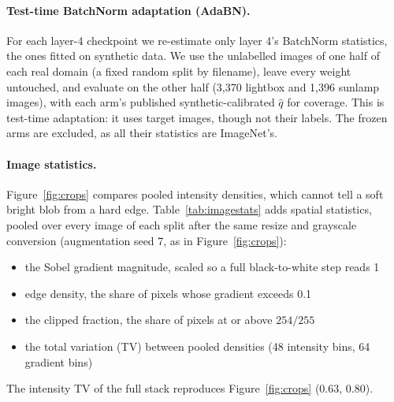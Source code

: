 \paragraph{Test-time BatchNorm adaptation (AdaBN).} For each layer-4 checkpoint we
re-estimate only layer 4's BatchNorm statistics, the ones fitted on synthetic data. We use
the unlabelled images of one half of each real domain (a fixed random split by filename),
leave every weight untouched, and evaluate on the other half (3{,}370 lightbox and 1{,}396
sunlamp images), with each arm's published synthetic-calibrated $\hat{q}$ for coverage. This is
test-time adaptation: it uses target images, though not their labels. The frozen arms are
excluded, as all their statistics are ImageNet's.


\paragraph{Image statistics.} Figure~\ref{fig:crops} compares pooled intensity densities,
which cannot tell a soft bright blob from a hard edge. Table~\ref{tab:imagestats} adds spatial
statistics, pooled over every image of each split after the same resize and grayscale
conversion (augmentation seed 7, as in Figure~\ref{fig:crops}):
\begin{itemize}[leftmargin=1.2em,itemsep=0pt,topsep=2pt]
  \item the Sobel gradient magnitude, scaled so a full black-to-white step reads 1
  \item edge density, the share of pixels whose gradient exceeds 0.1
  \item the clipped fraction, the share of pixels at or above $254/255$
  \item the total variation (TV) between pooled densities (48 intensity bins, 64 gradient
  bins)
\end{itemize}
The intensity TV of the full stack reproduces Figure~\ref{fig:crops} ($0.63$, $0.80$).
